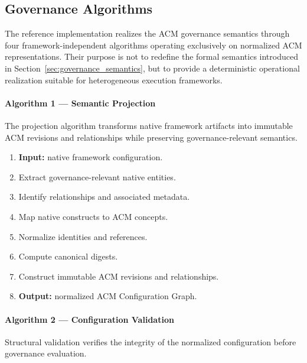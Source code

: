 \documentclass[10pt]{article}
\begin{document}
\subsection{Governance Algorithms}
\label{sec:governance_algorithms}

The reference implementation realizes the ACM governance semantics through four framework-independent algorithms operating exclusively on normalized ACM representations. Their purpose is not to redefine the formal semantics introduced in Section~\ref{sec:governance_semantics}, but to provide a deterministic operational realization suitable for heterogeneous execution frameworks. 

\paragraph{Algorithm 1 --- Semantic Projection}

The projection algorithm transforms native framework artifacts into immutable
ACM revisions and relationships while preserving governance-relevant semantics.

\begin{algorithm}[t]
	\caption{Semantic Projection}
	\begin{enumerate}
		\item \textbf{Input:} native framework configuration.
		\item Extract governance-relevant native entities.
		\item Identify relationships and associated metadata.
		\item Map native constructs to ACM concepts.
		\item Normalize identities and references.
		\item Compute canonical digests.
		\item Construct immutable ACM revisions and relationships.
		\item \textbf{Output:} normalized ACM Configuration Graph.
	\end{enumerate}
\end{algorithm}

\paragraph{Algorithm 2 --- Configuration Validation}

Structural validation verifies the integrity of the normalized configuration
before governance evaluation.
\end{document}

